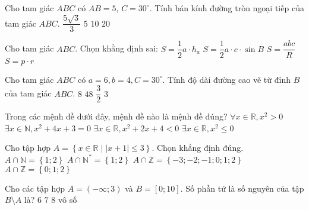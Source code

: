\begin{ex}
	Cho tam giác $ABC$ có $AB=5$, $C=30^\circ $. Tính bán kính đường tròn ngoại tiếp của tam giác $ABC$.
	\choice
	{$\dfrac{5\sqrt{3}}{3}$}
	{\True $5$}
	{$10$}
	{$20$}
\end{ex}
\begin{ex}
	Cho tam giác $ABC$. Chọn khẳng định sai:
	\choice
	{$S=\dfrac{1}{2}a \cdot h_a$}
	{$S=\dfrac{1}{2}a \cdot c \cdot \sin B$}
	{\True $S=\dfrac{abc}{R}$}
	{$S=p \cdot r$}
	\loigiai{
	}
\end{ex}
\begin{ex}
	Cho tam giác $ABC$ có $a=6,b=4,C=30^\circ $. Tính độ dài đường cao vẽ từ đỉnh $B$ của tam giác $ABC$.
	\choice
	{$8$}
	{$48$}
	{$\dfrac{3}{2}$}
	{\True $3$}
\end{ex}
\begin{ex}
	Trong các mệnh đề dưới đây, mệnh đề nào là mệnh đề đúng?
	\choice
	{$\forall x\in \mathbb{R},x^2>0$}
	{$\exists x\in \mathbb{N},x^2+4x+3=0$}
	{$\exists x\in \mathbb{R},x^2+2x+4<0$}
	{\True $\exists x\in \mathbb{R},x^2\le 0$}
\end{ex}
\begin{ex}
	Cho tập hợp $A=\left\{x\in \mathbb{R} \mid |x+1|\le 3 \right\}$. Chọn khẳng định đúng.
	\choice
	{$A\cap \mathbb{N}=\left\{ 1;2 \right\}$}
	{\True $A\cap \mathbb{N}^*=\left\{ 1;2 \right\}$}
	{$A\cap \mathbb{Z}=\left\{ -3;-2;-1;0;1;2 \right\}$}
	{$A\cap \mathbb{Z}=\left\{ 0;1;2 \right\}$}
\end{ex}
\begin{ex}
	Cho các tập hợp $A=\left(-\infty ;3\right)$ và $B=[0;10]$. Số phần tử là số nguyên của tập $B\setminus A$ là?
	\choice
	{$6$}
	{$7$}
	{\True $8$}
	{vô số}
\end{ex}
